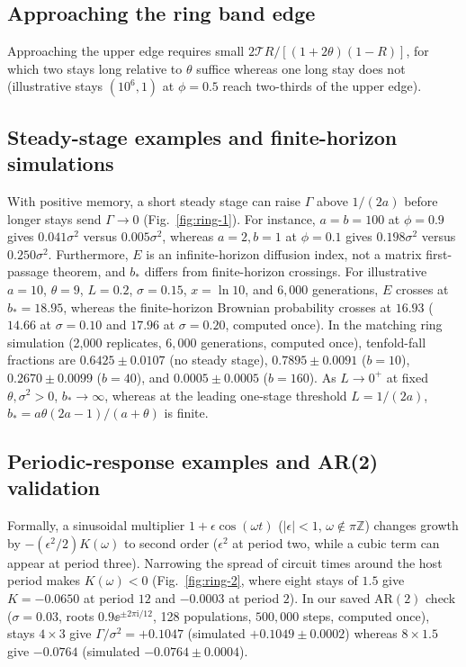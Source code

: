 \subsection{Approaching the ring band edge}\label{esm:ring-band-example}

Approaching the upper edge requires small $2\mathcal{T} R / [(1 + 2\theta)(1 - R)]$, for which two stays long relative to $\theta$ suffice whereas one long stay does not (illustrative stays $(10^6, 1)$ at $\phi = 0.5$ reach two-thirds of the upper edge).

\subsection{Steady-stage examples and finite-horizon simulations}\label{esm:ring-steady-runs}

With positive memory, a short steady stage can raise $\Gamma$ above $1/(2a)$ before longer stays send $\Gamma \to 0$ (Fig.~\ref{fig:ring-1}). For instance, $a = b = 100$ at $\phi = 0.9$ gives $0.041\sigma^2$ versus $0.005\sigma^2$, whereas $a = 2, b = 1$ at $\phi = 0.1$ gives $0.198\sigma^2$ versus $0.250\sigma^2$. Furthermore, $E$ is an infinite-horizon diffusion index, not a matrix first-passage theorem, and $b_*$ differs from finite-horizon crossings. For illustrative $a = 10$, $\theta = 9$, $L = 0.2$, $\sigma = 0.15$, $x = \ln 10$, and $6{,}000$ generations, $E$ crosses at $b_* = 18.95$, whereas the finite-horizon Brownian probability crosses at $16.93$ ($14.66$ at $\sigma = 0.10$ and $17.96$ at $\sigma = 0.20$, computed once). In the matching ring simulation (2,000 replicates, $6{,}000$ generations, computed once), tenfold-fall fractions are $0.6425 \pm 0.0107$ (no steady stage), $0.7895 \pm 0.0091$ ($b = 10$), $0.2670 \pm 0.0099$ ($b = 40$), and $0.0005 \pm 0.0005$ ($b = 160$). As $L \to 0^+$ at fixed $\theta, \sigma^2 > 0$, $b_* \to \infty$, whereas at the leading one-stage threshold $L = 1/(2a)$, $b_* = a\theta(2a - 1)/(a + \theta)$ is finite.

\subsection{Periodic-response examples and AR(2) validation}\label{esm:ring-spectral-runs}

Formally, a sinusoidal multiplier $1 + \epsilon\cos(\omega t)$ ($|\epsilon| < 1$, $\omega \notin \pi\mathbb{Z}$) changes growth by $-(\epsilon^2/2)K(\omega)$ to second order ($\epsilon^2$ at period two, while a cubic term can appear at period three). Narrowing the spread of circuit times around the host period makes $K(\omega) < 0$ (Fig.~\ref{fig:ring-2}, where eight stays of $1.5$ give $K = -0.0650$ at period $12$ and $-0.0003$ at period $2$). In our saved $\mathrm{AR}(2)$ check ($\sigma = 0.03$, roots $0.9\ee^{\pm 2\pi\mathrm{i}/12}$, 128 populations, $500{,}000$ steps, computed once), stays $4 \times 3$ give $\Gamma/\sigma^2 = +0.1047$ (simulated $+0.1049 \pm 0.0002$) whereas $8 \times 1.5$ give $-0.0764$ (simulated $-0.0764 \pm 0.0004$).

